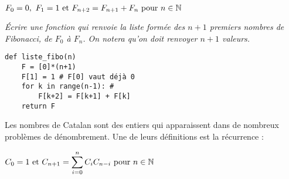 \begin{center}
$F_0 = 0,\ F_1 = 1 \hbox{ et }F_{n+2} = F_{n+1} + F_n \hbox{ pour }n\in {\mathbb N}$
\end{center}

\begin{Exercise}[title=Nombres de Fibonacci]\it
Écrire une fonction  qui renvoie la liste formée des $n+1$ premiers nombres de Fibonacci, de $F_0$ à $F_n$. On notera qu'on doit renvoyer $n+1$ valeurs.
\end{Exercise}
\begin{Answer}
\begin{lstlisting}
def liste_fibo(n)
    F = [0]*(n+1)
    F[1] = 1 # F[0] vaut déjà 0
    for k in range(n-1): # 
        F[k+2] = F[k+1] + F[k] 
    return F
\end{lstlisting}
\end{Answer}

\medskip

Les nombres de Catalan sont des entiers qui apparaissent dans de nombreux problèmes de dénombrement.
Une de leurs définitions est la récurrence :

\begin{center}
$\displaystyle C_0 = 1 \hbox{ et }C_{n+1}=\sum_{i=0}^n C_iC_{n-i}\hbox{ pour }n\in {\mathbb N}$
\end{center}

